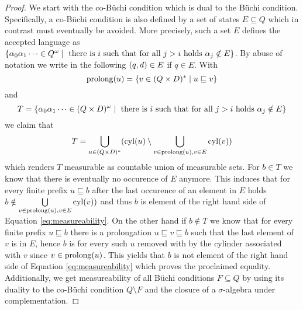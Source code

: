 \begin{proof}
  We start with the co-Büchi condition which is dual to the Büchi condition.
  Specifically, a co-Büchi condition is also defined by a set of
  states $E\subseteq Q$ which in contrast must eventually be avoided. More
  precisely, such a set $E$ defines the accepted language as
  $\left\{\alpha_{0}\alpha_{1}\dots\in Q^{\omega}\mid\text{ there is } i
  \text{ such that for all } j>i \text{ holds }\alpha_{j}\notin E\right\}$.
  By abuse of notation we write in the following
  $\left(q, d\right)\in E$ if $q\in E$. With
  \begin{equation*}
    \operatorname{prolong}(u) = \left\{v\in (Q\times D)^{*}\mid u\sqsubseteq v\right\}
  \end{equation*} and
  \begin{equation*}
    T = \left\{\alpha_{0}\alpha_{1}\dots\in (Q\times D)^{\omega}\mid\text{ there
    is } i \text{ such that for all } j>i \text{ holds }\alpha_{j}\notin E\right\}
  \end{equation*}
  we claim that
  \begin{equation} 
    T = \bigcup\limits_{u\in (Q\times D)^{*}}(
    \operatorname{cyl}(u)\setminus\bigcup\limits_{v\in\operatorname{prolong}(u),v\in E}\operatorname{cyl}(v))
    \label{eq:measureability}
  \end{equation}
  which renders $T$ measurable as countable union of measurable sets.
  For $b\in T$ we know that there is eventually no occurence of $E$
  anymore. This induces that for every finite prefix $u\sqsubseteq b$ after the
  last occurence of an element in $E$ holds
  $b\notin\bigcup\limits_{v\in\operatorname{prolong}(u),v\in E}\operatorname{cyl}(v))$ and thus $b$
  is element of the right hand side of Equation \ref{eq:measureability}. On the
  other hand if $b\notin T$ we know that for every finite prefix
  $u\sqsubseteq b$ there is a prolongation $u\sqsubseteq v\sqsubseteq b$ such
  that the last element of $v$ is in $E$, hence $b$ is for every such $u$
  removed with by the cylinder associated with $v$ since $v\in\operatorname{prolong}(u)$.
  This yields that $b$ is not element of the right hand side of Equation
  \ref{eq:measureability} which proves the proclaimed equality. Additionally,
  we get measureability of all Büchi conditions $F\subseteq Q$ by using its
  duality to the co-Büchi condition $Q\setminus F$ and the closure of a
  $\sigma$-algebra under complementation.


\end{proof}
